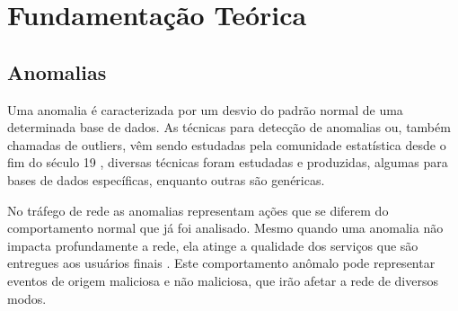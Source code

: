 \chapter{Fundamentação Teórica}

  \section{Anomalias}

\indent Uma anomalia é caracterizada por um desvio do padrão normal de uma determinada base de dados. As técnicas para detecção de anomalias ou, também chamadas de outliers, vêm sendo estudadas pela comunidade estatística desde o fim do século 19 \cite{edgeworth1887}, diversas técnicas foram estudadas e produzidas, algumas para bases de dados específicas, enquanto outras são genéricas.

\indent No tráfego de rede as anomalias representam ações que se diferem do comportamento normal que já foi analisado. Mesmo quando uma anomalia não impacta profundamente a rede, ela atinge a qualidade dos serviços que são entregues aos usuários finais \cite{Lakhina:2004}. Este comportamento anômalo pode representar eventos de origem maliciosa e não maliciosa, que irão afetar a rede de diversos modos.

